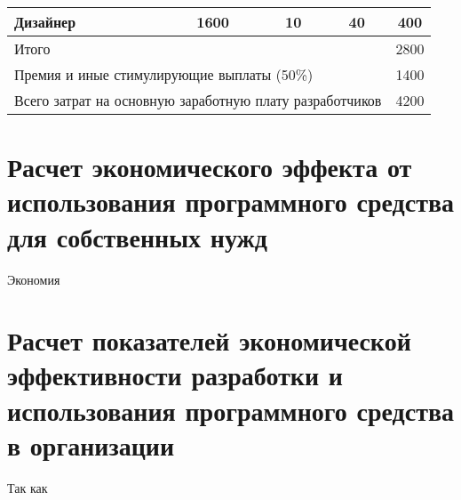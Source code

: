 \begin{table}[ht]
\begin{tabular}{|lccc|c|}
    \multicolumn{1}{|l|}{Дизайнер}                                                        & \multicolumn{1}{c|}{1600}                                                         & \multicolumn{1}{c|}{10}                                                          & 40                                                               & 400       \\ \hline
    \multicolumn{4}{|l|}{Итого}                                                                                                                                                                                                                                                                                                     & 2800      \\ \hline
    \multicolumn{4}{|l|}{Премия и иные стимулирующие выплаты (50\%)}                                                                                                                                                                                                                                                                & 1400      \\ \hline
    \multicolumn{4}{|l|}{Всего затрат на основную заработную плату разработчиков}                                                                                                                                                                                                                                                   & 4200      \\ \hline
    \end{tabular}
\end{table}

\section{Расчет экономического эффекта от использования программного средства для собственных нужд}\par
\hspace*{12.5 mm}Экономия 
\section{Расчет показателей экономической эффективности разработки и использования программного средства в организации}\par
\hspace*{12.5 mm}Так как 